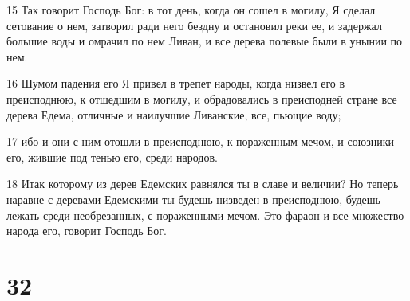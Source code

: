 \par 15 Так говорит Господь Бог: в тот день, когда он сошел в могилу, Я сделал сетование о нем, затворил ради него бездну и остановил реки ее, и задержал большие воды и омрачил по нем Ливан, и все дерева полевые были в унынии по нем.
\par 16 Шумом падения его Я привел в трепет народы, когда низвел его в преисподнюю, к отшедшим в могилу, и обрадовались в преисподней стране все дерева Едема, отличные и наилучшие Ливанские, все, пьющие воду;
\par 17 ибо и они с ним отошли в преисподнюю, к пораженным мечом, и союзники его, жившие под тенью его, среди народов.
\par 18 Итак которому из дерев Едемских равнялся ты в славе и величии? Но теперь наравне с деревами Едемскими ты будешь низведен в преисподнюю, будешь лежать среди необрезанных, с пораженными мечом. Это фараон и все множество народа его, говорит Господь Бог.

\chapter{32}

